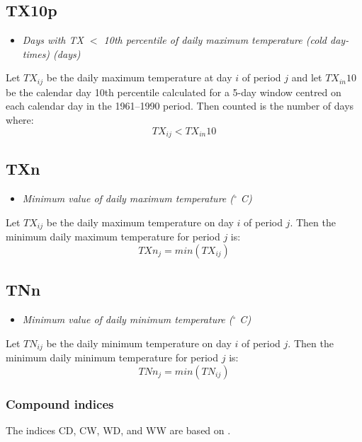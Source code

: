 \documentclass[a4paper,11pt]{article}
\begin{document}
\subsection*{TX10p}
\begin{itemize}
\item \textit{Days with TX $<$ 10th percentile of daily maximum
temperature (cold day-times) (days)}
\end{itemize}
Let $TX_{ij}$ be the daily maximum temperature at day $i$ of period
$j$ and let $TX_{in}10$ be the calendar day 10th percentile calculated
for a 5-day window centred on each calendar day in the 1961--1990
period. Then counted is the number of days where:
\begin{equation*}
TX_{ij} < TX_{in}10
\end{equation*}

\subsection*{TXn}
\begin{itemize}
\item \textit{Minimum value of daily maximum temperature ($^\circ$ C)}
\end{itemize}
Let $TX_{ij}$ be the daily maximum temperature on day $i$ of period
$j$. Then the minimum daily maximum temperature for period $j$ is:
\begin{equation*}
TXn_{j} = min(TX_{ij})
\end{equation*}

\subsection*{TNn}
\begin{itemize}
\item \textit{Minimum value of daily minimum temperature ($^\circ$ C)}
\end{itemize}
Let $TN_{ij}$ be the daily minimum temperature on day $i$ of period
$j$. Then the minimum daily minimum temperature for period $j$ is:
\begin{equation*}
TNn_{j} = min(TN_{ij})
\end{equation*}

\subsubsection{Compound indices}

The indices CD, CW, WD, and WW are based on \citet{beniston}.
\end{document}

